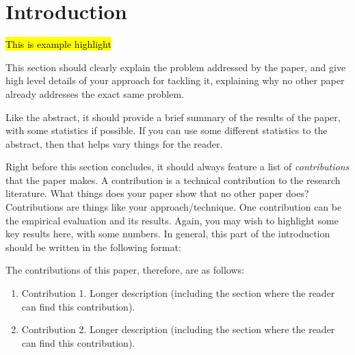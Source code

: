 \section{Introduction}
\label{sec:introduction}

%



\hl{This is example highlight}

This section should clearly explain the problem addressed by the paper, and give
high level details of your approach for tackling it, explaining why no other
paper already addresses the exact same problem.

Like the abstract, it should provide a brief summary of the results of the
paper, with some statistics if possible. If you can use some different
statistics to the abstract, then that helps vary things for the reader.

Right before this section concludes, it should always feature a list of {\em
contributions} that the paper makes. A contribution is a technical contribution
to the research literature. What things does your paper show that no other paper
does? Contributions are things like your approach/technique. One contribution
can be the empirical evaluation and its results. Again, you may wish to
highlight some key results here, with some numbers. In general, this part of the
introduction should be written in the following format:

The contributions of this paper, therefore, are as follows:

\begin{enumerate}

\item Contribution 1. Longer description (including the section where the reader
can find this contribution).

\item Contribution 2. Longer description (including the section where the reader
can find this contribution).

\end{enumerate}

